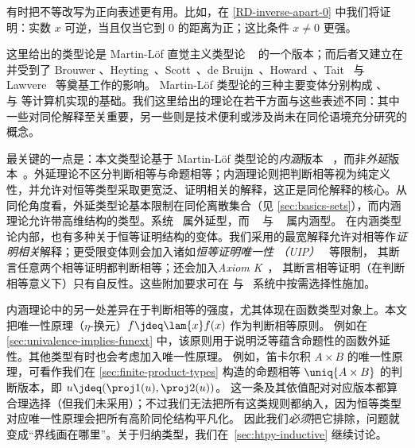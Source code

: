 有时把不等改写为正向表述更有用。比如，在 \cref{RD-inverse-apart-0} 中我们将证明：实数 $x$ 可逆，当且仅当它到 $0$ 的距离为正；这比条件 $x\neq 0$ 更强。

%

\sectionNotes

这里给出的类型论是 Martin-L\"{o}f 直觉主义类型论
~\cite{Martin-Lof-1972,Martin-Lof-1973,Martin-Lof-1979,martin-lof:bibliopolis} 的一个版本；而后者又建立在并受到了 Brouwer \cite{beeson}、Heyting~\cite{heyting1966intuitionism}、Scott~\cite{scott70}、de
Bruijn~\cite{deBruijn-1973}、Howard~\cite{howard:pat}、Tait~\cite{Tait-1966,Tait-1968} 与 Lawvere~\cite{lawvere:adjinfound} 等奠基工作的影响。
%
Martin-L\"{o}f 类型论的三种主要变体分别构成 \NuPRL \cite{constable+86nuprl-book}、\Coq~\cite{Coq} 与
\Agda \cite{norell2007towards} 等计算机实现的基础。我们这里给出的理论在若干方面与这些表述不同：其中一些对同伦解释至关重要，另一些则是技术便利或涉及尚未在同伦语境充分研究的概念。

%
%
%
%
最关键的一点是：本文类型论基于 Martin-L\"{o}f 类型论的\emph{内涵}版本
~\cite{Martin-Lof-1973}，而非\emph{外延}版本~\cite{Martin-Lof-1979}。外延理论不区分判断相等与命题相等；内涵理论则把判断相等视为纯定义性，并允许对恒等类型采取更宽泛、证明相关的解释，这正是同伦解释的核心。从同伦角度看，外延类型论基本限制在同伦离散集合（见 \cref{sec:basics-sets}），而内涵理论允许带高维结构的类型。\NuPRL 系统~\cite{constable+86nuprl-book} 属外延型，而 \Coq~\cite{Coq} 与 \Agda~\cite{norell2007towards} 属内涵型。
在内涵类型论内部，也有多种关于恒等证明结构的变体。我们采用的最宽解释允许对相等作\emph{证明相关}解释；更受限变体则会加入诸如\emph{恒等证明唯一性
  （UIP）}~\cite{Streicher93}
等限制，
%
%
其断言任意两个相等证明都判断相等；还会加入\emph{Axiom K}~\cite{Streicher93}，
其断言相等证明（在判断相等意义下）只有自反性。这些附加要求可在 \Coq
与 \Agda\ 系统中按需选择性施加。


内涵理论中的另一处差异在于判断相等的强度，尤其体现在函数类型对象上。本文把唯一性原理（$\eta$-换元）$f \jdeq \lam{x} f(x)$ 作为判断相等原则。
例如在 \cref{sec:univalence-implies-funext} 中，该原则用于说明泛等蕴含命题性的函数外延性。其他类型有时也会考虑加入唯一性原理。
例如，笛卡尔积 $A\times B$ 的唯一性原理，可看作我们在 \cref{sec:finite-product-types} 构造的命题相等 $\uniq{A\times B}$ 的判断版本，即 $u \jdeq (\proj1(u),\proj2(u))$。
这一条及其依值配对对应版本都算合理选择（但我们未采用）；不过我们无法把所有这类规则都纳入，因为恒等类型对应唯一性原理会把所有高阶同伦结构平凡化。
因此我们\emph{必须}把它排除，问题就变成“界线画在哪里”。关于归纳类型，我们在~\cref{sec:htpy-inductive} 继续讨论。

